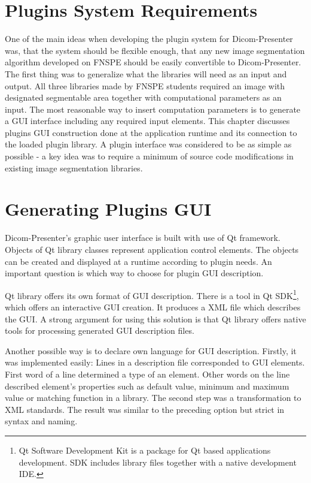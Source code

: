 \section{Plugins System Requirements}
One of the main ideas when developing the plugin system for Dicom-Presenter was, that the system should be flexible enough, that any new image segmentation algorithm developed on FNSPE should be easily convertible to Dicom-Presenter. The first thing was to generalize what the libraries will need as an input and output. All three libraries made by FNSPE students required an image with designated segmentable area together with computational parameters as an input. The most reasonable way to insert computation parameters is to generate a GUI interface including any required input elements. This chapter discusses plugins GUI construction done at the application runtime and its connection to the loaded plugin library. A plugin interface was considered to be as simple as possible - a key idea was to require a minimum of source code modifications in existing image segmentation libraries.

\section{Generating Plugins GUI}

Dicom-Presenter's graphic user interface is built with use of Qt framework. Objects of Qt library classes represent application control elements. The objects can be created and displayed at a runtime according to plugin needs. An important question is which way to choose for plugin GUI description.

Qt library offers its own format of GUI description. There is a tool in Qt SDK\footnote{Qt Software Development Kit is a package for Qt based applications development. SDK includes library files together with a native development IDE.}, which offers an interactive GUI creation. It produces a XML file which describes the GUI. A strong argument for using this solution is that Qt library offers native tools for processing generated GUI description files.

Another possible way is to declare own language for GUI description. Firstly, it was implemented easily: Lines in a description file corresponded to GUI elements. First word of a line determined a type of an element. Other words on the line described element's properties such as default value, minimum and maximum value or matching function in a library. The second step was a transformation to XML standards. The result was similar to the preceding option but strict in syntax and naming. 

